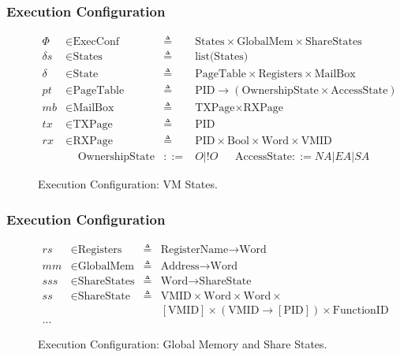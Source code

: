 \documentclass{beamer}
\newcommand*{\defined}{\triangleq}
\newcommand*{\maps}{\rightarrow}
\newcommand*{\derived}{::=}
\newcommand*{\CONF}{\text{ExecConf}}
\newcommand*{\STATE}{\text{State}}
\newcommand*{\MEM}{\text{GlobalMem}}
\newcommand*{\SSS}{\text{ShareStates}}
\newcommand*{\PID}{\text{PID}}
\newcommand*{\PT}{\text{PageTable}}
\newcommand*{\AS}{\text{AccessState}}
\newcommand*{\OS}{\text{OwnershipState}}
\newcommand*{\REGS}{\text{Registers}}
\newcommand*{\ADDR}{\text{Address}}
\newcommand*{\WORD}{\text{Word}}
\newcommand*{\VMID}{\text{VMID}}
\newcommand*{\REGNAMES}{\text{RegisterName}}
\newcommand*{\MB}{\text{MailBox}}
\begin{document}
\begin{frame}
  \frametitle{Execution Configuration}
\begin{figure}
  \begin{align*}
    \Phi &\in \CONF &\defined &\text{States} \times \MEM \times \SSS \\
    \delta s &\in \text{States} &\defined &\text{list(States)} \\
    \delta &\in \STATE &\defined &\PT \times \REGS \times \MB \\
    pt & \in \PT & \defined & \PID \maps (\OS \times \AS) \\
    mb & \in \MB &\defined &\text{TXPage} \times  \text{RXPage}\\
    tx & \in \text{TXPage} &\defined &\PID\\
    rx & \in \text{RXPage} &\defined &\PID \times \text{Bool} \times \WORD \times \VMID \\
      & \;\;\;\; \OS & \derived & O | !O  ~~~~~~~  \AS  \derived  NA | EA | SA
  \end{align*}
  \caption{Execution Configuration: VM States.}
\end{figure}

\end{frame}

\begin{frame}
  \frametitle{Execution Configuration}
\begin{figure}
  \begin{align*}
      rs & \in \REGS &\defined  &\REGNAMES \maps \WORD \\
    mm & \in \MEM &\defined  &\ADDR \maps \WORD \\
    sss & \in \SSS &\defined  &\WORD \maps \text{ShareState} \\
    ss & \in \text{ShareState} &\defined &\VMID \times \WORD \times \WORD \times\\
         &&&   [\VMID] \times (\VMID \maps [\PID]) \times \text{FunctionID}\\
    ...
  \end{align*}
  \caption{Execution Configuration: Global Memory and Share States.}
\end{figure}

\end{frame}
\end{document}
